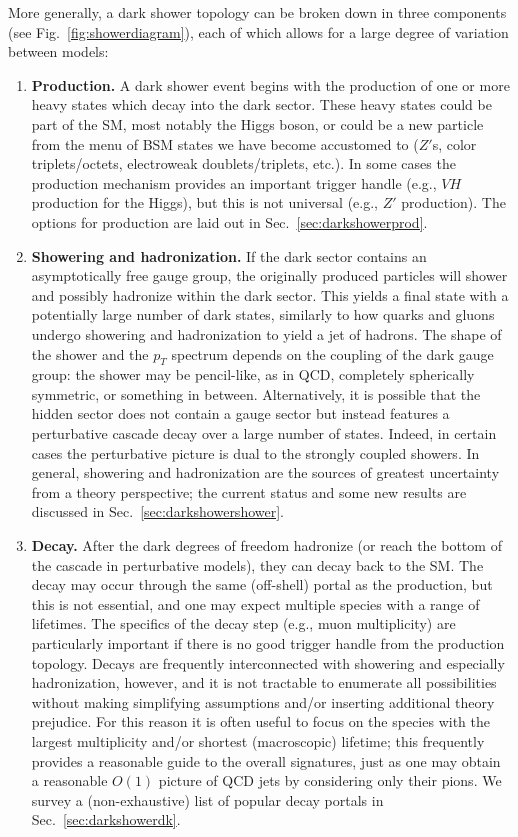 More generally, a dark shower topology can be broken down in three components (see Fig.~\ref{fig:showerdiagram}), each of which allows for a large degree of variation between models:
\begin{enumerate}
\item \textbf{Production.} A dark shower event begins with the production of one or more heavy states which decay into the dark sector. These heavy states could be part of the SM, most notably the Higgs boson, or could be a new particle from the menu of BSM states we have become accustomed to ($Z'$s, color triplets/octets, electroweak doublets/triplets, etc.). In some cases the production mechanism provides an important trigger handle (e.g., $VH$  production for the Higgs), but this is not universal (e.g., $Z'$ production). The options for production are laid out in Sec.~\ref{sec:darkshowerprod}.

\item \textbf{Showering and hadronization.} If the dark sector contains an asymptotically free gauge group, the originally produced particles will shower and possibly hadronize within the dark sector. This yields a final state with a potentially large number of dark states, similarly to how quarks and gluons undergo showering and hadronization to yield a jet of hadrons. The shape of the shower and the $p_T$ spectrum depends on the coupling of the dark gauge group: the shower may be pencil-like, as in QCD, completely spherically symmetric, or something in between. Alternatively, it is possible that the hidden sector does not contain a gauge sector but instead features a perturbative cascade decay over a large number of states. Indeed, in certain cases the perturbative picture is dual to the strongly coupled showers. In general, showering and hadronization are the sources of greatest uncertainty from a theory perspective; the current status and some new results are discussed in Sec.~\ref{sec:darkshowershower}.

\item \textbf{Decay.} After the dark degrees of freedom hadronize (or reach the bottom of the cascade in perturbative models), they can decay back to the SM. The decay may occur through the same (off-shell) portal as the production, but this is not essential, and one may expect multiple species with a range of lifetimes. The specifics of the decay step (e.g., muon multiplicity) are particularly important if there is no good trigger handle from the production topology. Decays are frequently interconnected with showering and especially hadronization, however, and it is not tractable to enumerate all possibilities without making simplifying assumptions and/or inserting additional theory prejudice. For this reason it is often useful to focus on the species with the largest multiplicity and/or shortest (macroscopic) lifetime; this frequently provides a reasonable guide to the overall signatures, just as one may obtain a reasonable $O(1)$ picture of QCD jets by considering only their pions. We survey a (non-exhaustive) list of popular decay portals in Sec.~\ref{sec:darkshowerdk}.

\end{enumerate}

